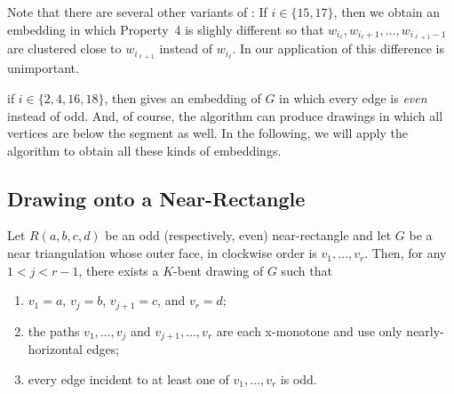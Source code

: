\documentclass{patmorin}
\begin{document}
Note that there are several other variants of
: If $i\in\{15,17\}$, then we obtain
an embedding in which Property~4 is slighly different so that
$w_{i_\ell},w_{i_\ell+1},\ldots,w_{i_{\ell+1}-1}$ are clustered close
to $w_{i_{\ell+1}}$ instead of $w_{i_\ell}$. In our application of
 this difference is unimportant.

if $i\in\{2,4,16,18\}$, then  gives an embedding
of $G$ in which every edge is \emph{even} instead of odd.  And, of course,
the algorithm can produce drawings in which all vertices are below the
segment as well.  In the following, we will apply the algorithm to obtain
all these kinds of embeddings.




\subsection{Drawing onto a Near-Rectangle}


\begin{lem}
   Let $R(a,b,c,d)$ be an odd (respectively, even) near-rectangle and
   let $G$ be a near triangulation whose outer face, in clockwise order
   is $v_1,\ldots,v_r$.  Then, for any $1<j<r-1$, there exists a $K$-bent
   drawing of $G$ such that
\begin{enumerate}
   \item $v_1=a$, $v_j=b$, $v_{j+1}=c$, and $v_r=d$;
   \item the paths $v_1,\ldots,v_j$ and $v_{j+1},\ldots,v_r$ are each x-monotone and use only nearly-horizontal edges;
   \item every edge incident to at least one of $v_1,\ldots,v_r$ is odd.
\end{enumerate}
\end{lem}
\end{document}
